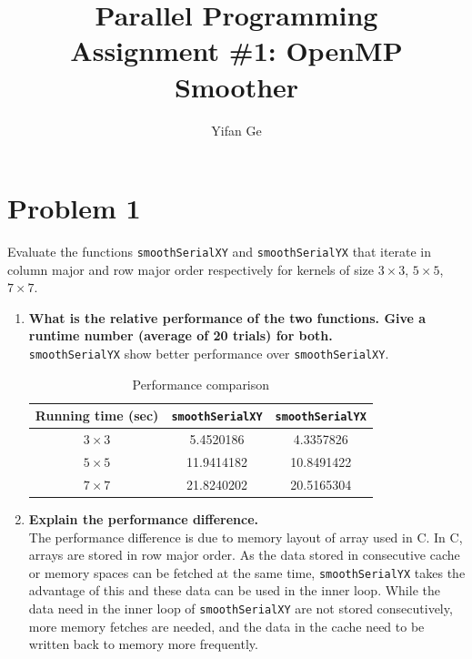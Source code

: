 \documentclass[letterpaper, 11pt]{article}
\begin{document}
\title{Parallel Programming \\ Assignment \#1: OpenMP Smoother}
\author{Yifan Ge }


\maketitle



\section{Problem 1}

Evaluate the functions \texttt{smoothSerialXY} and \texttt{smoothSerialYX} that iterate in column major and row major order respectively for kernels of size $3 \times 3$, $5 \times 5$, $7 \times 7$.

\begin{enumerate}
\item \textbf{What is the relative performance of the two functions. Give a runtime number (average of 20 trials) for both.}\\
\texttt{smoothSerialYX} show better performance over \texttt{smoothSerialXY}.
\begin{table}[h]
    \hspace{30pt}
    \begin{tabular}{|c|c|c|}
        \hline
        Running time (sec) & \texttt{smoothSerialXY} & \texttt{smoothSerialYX} \\ \hline
        $3 \times 3$          & 5.4520186             & 4.3357826             \\ 
        $5 \times 5$        & 11.9414182            & 10.8491422            \\ 
        $7 \times 7$         & 21.8240202            & 20.5165304            \\ 
        \hline
    \end{tabular}
    \caption{Performance comparison}
\end{table}
\item \textbf{Explain the performance difference.}\\
The performance difference is due to memory layout of array used in C. In C, arrays are stored in row major order. As the data stored in consecutive cache or memory spaces can be fetched at the same time, \texttt{smoothSerialYX} takes the advantage of this and these data can be used in the inner loop. While the data need in the inner loop of \texttt{smoothSerialXY} are not stored consecutively, more memory fetches are needed, and the data in the cache  need to be written back to memory more frequently. 
\end{enumerate}
\end{document}
